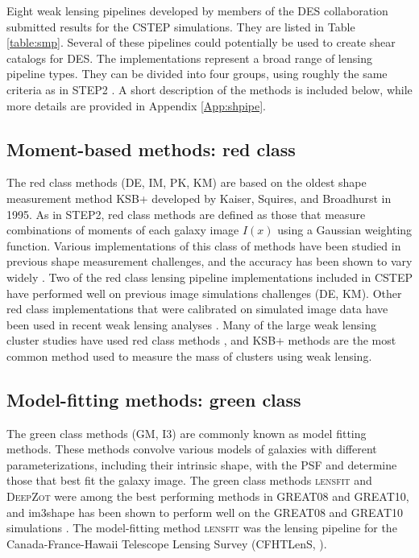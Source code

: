 Eight weak lensing pipelines developed by members of the DES collaboration submitted 
results for the CSTEP simulations. They are listed in Table \ref{table:smp}.
Several of these pipelines could potentially
be used to create shear catalogs for DES. The implementations
represent a broad range of lensing pipeline types. They can be divided
into four groups, using roughly the same criteria 
as in STEP2 \citep{STEP2}. A short description of the methods is
included below, while more details are provided in
Appendix \ref{App:shpipe}.\\

\subsection{Moment-based methods: red class}
The red class methods (DE, IM, PK, KM) are based on the oldest 
shape measurement method KSB+ developed by Kaiser, Squires, and Broadhurst in 1995. As in STEP2, red class methods are
defined as those that measure combinations of
moments of each galaxy image $I(x)$ using a Gaussian 
weighting function. Various implementations
of this class of methods have been studied in previous shape
measurement challenges, and the accuracy has been shown 
to vary widely \citep{STEP2, GREAT10}.  Two of the red class lensing
pipeline implementations included in CSTEP have performed well on
previous image simulations challenges (DE, KM). Other 
red class implementations that were calibrated on
simulated image data have been used in  recent 
weak lensing analyses \citep[e.g.][]{Gruen_s, Apple, TS}. Many of the
large weak lensing cluster studies have used red class
methods \citep{HH,VDLinden}, and KSB+ methods are the most common
method used to measure the mass of clusters using weak lensing.
 
\subsection{Model-fitting methods: green class}
The green class methods (GM, I3) are commonly known as model fitting
methods. These methods convolve various models of galaxies with different 
parameterizations, including their intrinsic shape, with the PSF and
determine those that best fit the galaxy image. The green class methods
\textsc{lensfit} and \textsc{DeepZot} were among the best performing 
methods in GREAT08 and GREAT10, and im3shape has been shown 
to perform well on the GREAT08 and GREAT10 simulations \citep{Jzun}. 
The model-fitting method \textsc{lensfit} was 
the lensing pipeline for the Canada-France-Hawaii 
Telescope Lensing Survey (CFHTLenS, \citealt{CHey}). 

